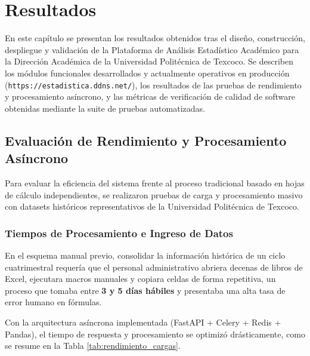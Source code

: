 \chapter{Resultados}

En este capítulo se presentan los resultados obtenidos tras el diseño, construcción, despliegue y validación de la Plataforma de Análisis Estadístico Académico para la Dirección Académica de la Universidad Politécnica de Texcoco. Se describen los módulos funcionales desarrollados y actualmente operativos en producción (\texttt{https://estadistica.ddns.net/}), los resultados de las pruebas de rendimiento y procesamiento asíncrono, y las métricas de verificación de calidad de software obtenidas mediante la suite de pruebas automatizadas.



\section{Evaluación de Rendimiento y Procesamiento Asíncrono}

Para evaluar la eficiencia del sistema frente al proceso tradicional basado en hojas de cálculo independientes, se realizaron pruebas de carga y procesamiento masivo con datasets históricos representativos de la Universidad Politécnica de Texcoco.

\subsection{Tiempos de Procesamiento e Ingreso de Datos}

En el esquema manual previo, consolidar la información histórica de un ciclo cuatrimestral requería que el personal administrativo abriera decenas de libros de Excel, ejecutara macros manuales y copiara celdas de forma repetitiva, un proceso que tomaba entre \textbf{3 y 5 días hábiles} y presentaba una alta tasa de error humano en fórmulas.

Con la arquitectura asíncrona implementada (FastAPI + Celery + Redis + Pandas), el tiempo de respuesta y procesamiento se optimizó drásticamente, como se resume en la Tabla \ref{tab:rendimiento_cargas}.


